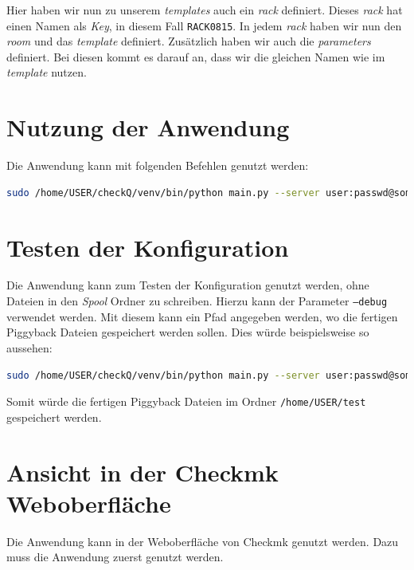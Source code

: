 \noindent
Hier haben wir nun zu unserem \textit{templates} auch ein \textit{rack} definiert.
Dieses \textit{rack} hat einen Namen als \textit{Key}, in diesem Fall \texttt{RACK0815}.
In jedem \textit{rack} haben wir nun den \textit{room} und das \textit{template} definiert.
Zusätzlich haben wir auch die \textit{parameters} definiert.
Bei diesen kommt es darauf an, dass wir die gleichen Namen wie im \textit{template} nutzen.

\section{Nutzung der Anwendung}\label{sec:nutzung-der-anwendung}
Die Anwendung kann mit folgenden Befehlen genutzt werden:

\begin{lstlisting}[language=bash, caption=Anwendung starten, label=lst:start]
sudo /home/USER/checkQ/venv/bin/python main.py --server user:passwd@some-address.de --token some-token
\end{lstlisting}

\section{Testen der Konfiguration}\label{sec:testen-der-konfiguration}
Die Anwendung kann zum Testen der Konfiguration genutzt werden, ohne Dateien in den \textit{Spool} Ordner zu schreiben.
Hierzu kann der Parameter \texttt{--debug} verwendet werden.
Mit diesem kann ein Pfad angegeben werden, wo die fertigen Piggyback Dateien gespeichert werden sollen.
Dies würde beispielsweise so aussehen:

\begin{lstlisting}[language=bash, caption=Anwendung Debug starten, label=lst:start-debug]
sudo /home/USER/checkQ/venv/bin/python main.py --server user:passwd@some-address.de --token some-token --debug /home/USER/test
\end{lstlisting}

\noindent
Somit würde die fertigen Piggyback Dateien im Ordner \texttt{/home/USER/test} gespeichert werden.

\section{Ansicht in der Checkmk Weboberfläche}\label{sec:ansicht-in-der-checkmk-weboberflaeche}
Die Anwendung kann in der Weboberfläche von \Gls{Checkmk} genutzt werden.
Dazu muss die Anwendung zuerst genutzt werden.


